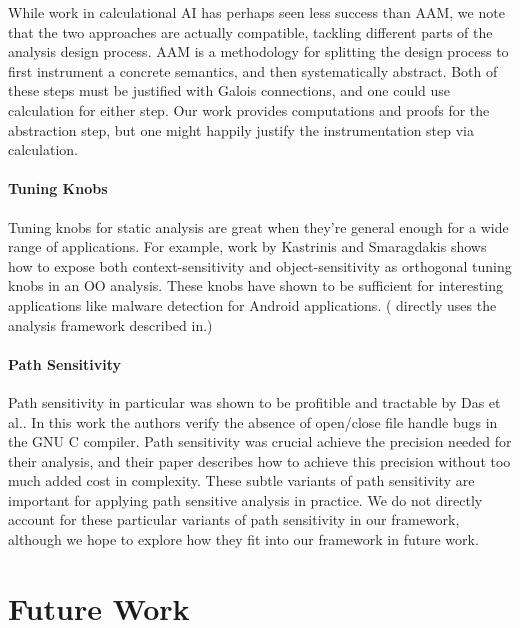 \documentclass{article}
\begin{document}
While work in calculational AI has perhaps seen less success than AAM, 
  we note that the two approaches are actually compatible, tackling different parts of the analysis design process.
AAM is a methodology for splitting the design process to first instrument a concrete semantics, and then systematically abstract.
Both of these steps must be justified with Galois connections, and one could use calculation for either step.
Our work provides computations and proofs for the abstraction step, but one might happily justify the instrumentation step via calculation.

\paragraph{Tuning Knobs}
Tuning knobs for static analysis are great when they're general enough for a wide range of applications.
For example, work by Kastrinis and Smaragdakis\cite{kastrinis:2013:hybrid-points-to}\cite{smaragdakis:2011:pick-your-contexts-well} 
  shows how to expose both context-sensitivity and object-sensitivity as orthogonal tuning knobs in an OO analysis.
These knobs have shown to be sufficient for interesting applications like malware detection for Android applications\cite{feng:2014:apposcopy}.
(\cite{feng:2014:apposcopy} directly uses the analysis framework described in\cite{kastrinis:2013:hybrid-points-to}.)

\paragraph{Path Sensitivity}
Path sensitivity in particular was shown to be profitible and tractable by Das et al.\cite{das:2002:esp}.
In this work the authors verify the absence of open/close file handle bugs in the GNU C compiler.
Path sensitivity was crucial achieve the precision needed for their analysis, and their paper describes how to achieve this precision without too much added cost in complexity.
These subtle variants of path sensitivity are important for applying path sensitive analysis in practice.
We do not directly account for these particular variants of path sensitivity in our framework, 
  although we hope to explore how they fit into our framework in future work.

\section{Future Work}
\label{FutureWork}
\end{document}
